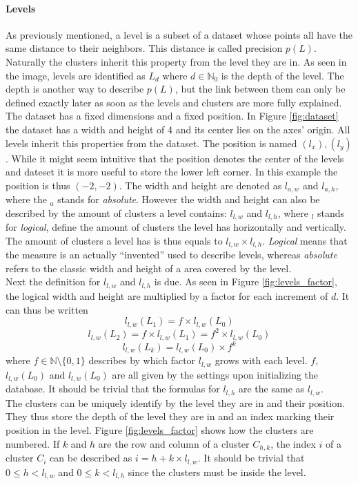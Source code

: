 \documentclass[10pt,a4paper,titlepage]{article}
\begin{document}
	\paragraph{Levels}\label{sec:levels}
	As previously mentioned, a level is a subset of a dataset whose points all have the same distance to their neighbors. This distance is called precision \(p(L)\). Naturally the clusters inherit this property from the level they are in. As seen in the image, levels are identified as \(L_d\) where \(d \in \mathbb{N}_0\) is the depth of the level. The depth is another way to describe \(p(L)\), but the link between them can only be defined exactly later as soon as the levels and clusters are more fully explained.\\
	The dataset has a fixed dimensions and a fixed position. In Figure \ref{fig:dataset} the dataset has a width and height of 4 and its center lies on the axes' origin. All levels inherit this properties from the dataset. The position is named \((l_x),(l_y)\). While it might seem intuitive that the position denotes the center of the levels and dateset it is more useful to store the lower left corner. In this example the position is thus \((-2,-2)\). The width and height are denoted as \(l_{a,w}\) and \(l_{a,h}\), where the \(_a\) stands for \emph{absolute}. However the width and height can also be described by the amount of clusters a level contains: \(l_{l,w}\) and \(l_{l,h}\), where \(_l\) stands for \emph{logical}, define the amount of clusters the level has horizontally and vertically. The amount of clusters a level has is thus equals to \(l_{l,w} \times l_{l,h}\). \emph{Logical} means that the measure is an actually ``invented'' used to describe levels, whereas \emph{absolute} refers to the classic width and height of a area covered by the level.\\
	Next the definition for \(l_{l,w}\) and \(l_{l,h}\) is due. As seen in Figure \ref{fig:levels_factor}, the logical width and height are multiplied by a factor for each increment of \(d\). It can thus be written
	\[l_{l,w}(L_1)= f \times l_{l,w}(L_0)\]
	\[l_{l,w}(L_2)= f \times l_{l,w}(L_1) = f^2 \times l_{l,w}(L_0)\]
	\[l_{l,w}(L_k) = l_{l,w}(L_0) \times f^k\]
	where \(f \in \mathbb{N}\setminus\{0,1\}\) describes by which factor \(l_{l,w}\) grows with each level. \(f\), \(l_{l,w}(L_0)\) and \(l_{l,w}(L_0)\) are all given by the settings upon initializing the database. It should be trivial that the formulas for \(l_{l,h}\) are the same as \(l_{l,w}\).\\
	The clusters can be uniquely identify by the level they are in and their position. They thus store the depth of the level they are in and an index marking their position in the level. Figure \ref{fig:levels_factor} shows how the clusters are numbered. If \(k\) and \(h\) are the row and column of a cluster \(C_{h,k}\), the index \(i\) of a cluster \(C_i\) can be described as \(i = h + k \times l_{l,w}\). It should be trivial that \(0 \leq h < l_{l,w}\) and \(0 \leq k < l_{l,h}\) since the clusters must be inside the level.\\
\end{document}
